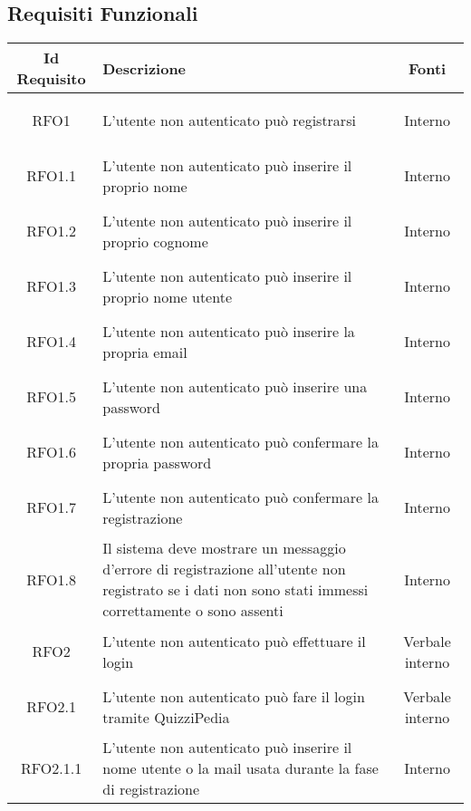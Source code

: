 \subsection{Requisiti Funzionali}
\normalsize
\begin{longtable}{|c|>{\centering}m{7cm}|c|}
\hline
\textbf{Id Requisito} & \textbf{Descrizione} & \textbf{Fonti}\\
\hline
\endhead
\hypertarget{RFO1}{RFO1} & L’utente non autenticato può registrarsi & Interno
\\ \hline

\hypertarget{RFO1.1}{RFO1.1} & L’utente non autenticato può inserire il proprio nome & Interno
\\ \hline

\hypertarget{RFO1.2}{RFO1.2} & L’utente non autenticato può inserire il proprio cognome & Interno
\\ \hline

\hypertarget{RFO1.3}{RFO1.3} & L’utente non autenticato può inserire il proprio nome utente & Interno
\\ \hline

\hypertarget{RFO1.4}{RFO1.4} & L’utente non autenticato può inserire la propria email & Interno
\\ \hline

\hypertarget{RFO1.5}{RFO1.5} & L’utente non autenticato può inserire una password & Interno
\\ \hline

\hypertarget{RFO1.6}{RFO1.6} & L’utente non autenticato può confermare la propria password & Interno
\\ \hline

\hypertarget{RFO1.7}{RFO1.7} & L’utente non autenticato può confermare la registrazione & Interno
\\ \hline

\hypertarget{RFO1.8}{RFO1.8} & Il sistema deve mostrare un messaggio d’errore di registrazione all’utente non registrato se i dati non sono stati immessi correttamente o sono assenti & Interno
\\ \hline

\hypertarget{RFO2}{RFO2} & L’utente non autenticato può effettuare il login & Verbale interno
\\ \hline

\hypertarget{RFO2.1}{RFO2.1} & L'utente non autenticato può fare il login tramite QuizziPedia & Verbale interno
\\ \hline

\hypertarget{RFO2.1.1}{RFO2.1.1} & L'utente non autenticato può inserire il nome utente o la mail usata durante la fase di registrazione & Interno
\\ \hline


\end{longtable}
